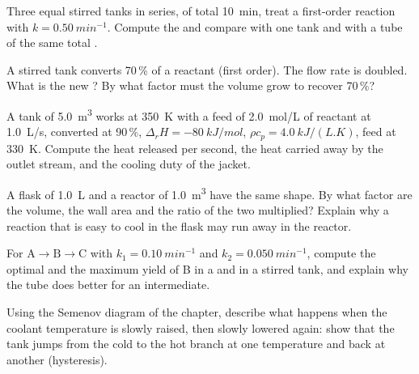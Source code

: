 \begin{exercise}[$\star\star$]\label{exo:b2:continuous-reactors:6}
Three equal stirred tanks in series, of total  \qty{10}{min},
treat a first-order reaction with $k = \qty{0.50}{min^{-1}}$. Compute the
 and compare with one tank and with a tube of the same total
.
\end{exercise}

\begin{exercise}[$\star\star$]\label{exo:b2:continuous-reactors:7}
A stirred tank converts 70\,\% of a reactant (first order). The flow rate is
doubled. What is the new ? By what factor must the volume grow to
recover 70\,\%?
\end{exercise}

\begin{exercise}[$\star\star$]\label{exo:b2:continuous-reactors:8}
A tank of \qty{5.0}{m^3} works at \qty{350}{K} with a feed of
\qty{2.0}{mol/L} of reactant at \qty{1.0}{L/s}, converted at 90\,\%, $\Delta_r H
= \qty{-80}{kJ/mol}$, $\rho c_p = \qty{4.0}{kJ/(L.K)}$, feed at \qty{330}{K}.
Compute the heat released per second, the heat carried away by the outlet
stream, and the cooling duty of the jacket.
\end{exercise}

\begin{exercise}[$\star\star$]\label{exo:b2:continuous-reactors:9}
A flask of \qty{1.0}{L} and a reactor of \qty{1.0}{m^3} have the same shape.
By what factor are the volume, the wall area and the ratio of the two
multiplied? Explain why a reaction that is easy to cool in the flask may run
away in the reactor.
\end{exercise}

\begin{exercise}[$\star\star\star$]\label{exo:b2:continuous-reactors:10}
For $\mathrm A \to \mathrm B \to \mathrm C$ with $k_1 = \qty{0.10}{min^{-1}}$
and $k_2 = \qty{0.050}{min^{-1}}$, compute the optimal  and the
maximum yield of B in a  and in a stirred tank, and explain
why the tube does better for an intermediate.
\end{exercise}

\begin{exercise}[$\star\star\star$]\label{exo:b2:continuous-reactors:11}
Using the Semenov diagram of the chapter, describe what happens when the
coolant temperature is slowly raised, then slowly lowered again: show that
the tank jumps from the cold to the hot branch at one temperature and back at
another (hysteresis).
\end{exercise}

